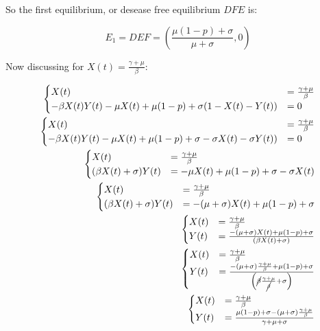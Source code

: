   So the first equilibrium, or desease free equilibrium $DFE$ is:

  $$E_1 = DEF = \left(\frac{\mu (1-p) + \sigma}{\mu+\sigma},0\right)$$

  Now discussing for $X(t) = \frac{\gamma+\mu}{\beta}$:

  \begin{align*}
    \begin{cases}
      X(t) &= \frac{\gamma+\mu}{\beta}\\
      -\beta X(t)Y(t) - \mu X(t) + \mu (1-p) + \sigma (1 - X(t) - Y(t)) &= 0\\
    \end{cases}\\
    \begin{cases}
      X(t) &= \frac{\gamma+\mu}{\beta}\\
      -\beta X(t)Y(t) - \mu X(t) + \mu (1-p) + \sigma - \sigma X(t) - \sigma Y(t)) &= 0\\
    \end{cases}\\
    \begin{cases}
      X(t) &= \frac{\gamma+\mu}{\beta}\\
      (\beta X(t) +\sigma)Y(t) &= - \mu X(t) + \mu (1-p) + \sigma - \sigma X(t)\\
    \end{cases}\\
    \begin{cases}
      X(t) &= \frac{\gamma+\mu}{\beta}\\
      (\beta X(t) +\sigma)Y(t) &= - (\mu+\sigma)X(t) + \mu (1-p) + \sigma\\
    \end{cases}\\
    \begin{cases}
      X(t) &= \frac{\gamma+\mu}{\beta}\\
      Y(t) &= \frac{- (\mu+\sigma)X(t) + \mu (1-p) + \sigma}{(\beta X(t) +\sigma)}\\
    \end{cases}\\
    \begin{cases}
      X(t) &= \frac{\gamma+\mu}{\beta}\\
      Y(t) &= \frac{- (\mu+\sigma)\frac{\gamma+\mu}{\beta} + \mu (1-p) + \sigma}{\left(\cancel{\beta} \frac{\gamma+\mu}{\cancel{\beta}} +\sigma\right)}\\
    \end{cases}\\
    \begin{cases}
      X(t) &= \frac{\gamma+\mu}{\beta}\\
      Y(t) &= \frac{ \mu (1-p) + \sigma- (\mu+\sigma)\frac{\gamma+\mu}{\beta}}{\gamma+\mu +\sigma}\\
    \end{cases}\\
  \end{align*}

